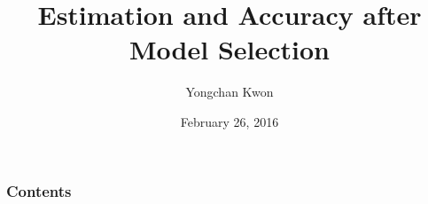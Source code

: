 \documentclass{beamer}
\title[2016 winter school]{Estimation and Accuracy after Model Selection} %
\author[Yongchan Kwon]{Yongchan Kwon} %
\institute[] %
{
\textit{Department of Statistics, Seoul National University, Seoul,  Korea}
}
\date{February 26, 2016}
\begin{document}
\begin{frame}
\titlepage %
\end{frame}

\begin{frame}
\frametitle{Contents} %
\tableofcontents %
\end{frame}


\end{document}
